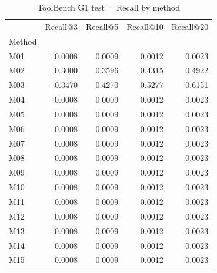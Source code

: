 \begin{table}
\caption{ToolBench G1 test · Recall by method}
\label{tab:ToolBench-G1-test-comparison-comparison-recall}
\begin{tabular}{lrrrr}
\toprule
 & Recall@3 & Recall@5 & Recall@10 & Recall@20 \\
Method &  &  &  &  \\
\midrule
M01 & 0.0008 & 0.0009 & 0.0012 & 0.0023 \\
M02 & 0.3000 & 0.3596 & 0.4315 & 0.4922 \\
M03 & 0.3470 & 0.4270 & 0.5277 & 0.6151 \\
M04 & 0.0008 & 0.0009 & 0.0012 & 0.0023 \\
M05 & 0.0008 & 0.0009 & 0.0012 & 0.0023 \\
M06 & 0.0008 & 0.0009 & 0.0012 & 0.0023 \\
M07 & 0.0008 & 0.0009 & 0.0012 & 0.0023 \\
M08 & 0.0008 & 0.0009 & 0.0012 & 0.0023 \\
M09 & 0.0008 & 0.0009 & 0.0012 & 0.0023 \\
M10 & 0.0008 & 0.0009 & 0.0012 & 0.0023 \\
M11 & 0.0008 & 0.0009 & 0.0012 & 0.0023 \\
M12 & 0.0008 & 0.0009 & 0.0012 & 0.0023 \\
M13 & 0.0008 & 0.0009 & 0.0012 & 0.0023 \\
M14 & 0.0008 & 0.0009 & 0.0012 & 0.0023 \\
M15 & 0.0008 & 0.0009 & 0.0012 & 0.0023 \\
\bottomrule
\end{tabular}
\end{table}
